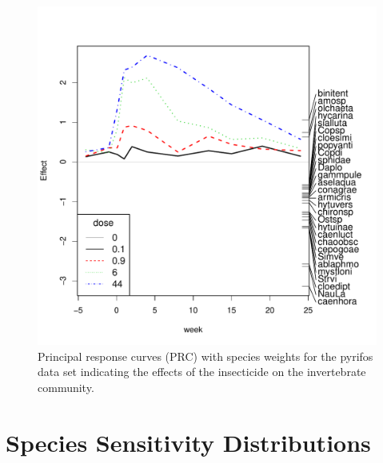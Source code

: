 \documentclass{tufte-book}\usepackage{knitr}
\begin{document}
\begin{figure}
\begin{knitrout}
\color{fgcolor}

{\centering \includegraphics[width=\linewidth]{graphics/pyrifos_plot} 

}



\end{knitrout}

\caption{Principal response curves (PRC) with species weights for the pyrifos
data set indicating the effects of the insecticide on the invertebrate community.}
\end{figure}





\section{Species Sensitivity Distributions}



\backmatter
\appendix
\end{document}
